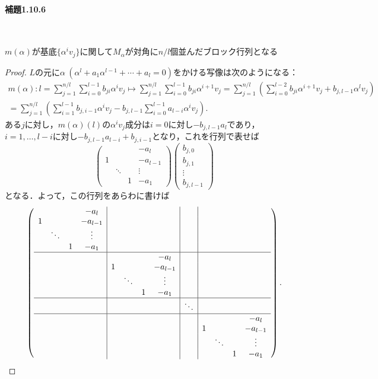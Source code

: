 \paragraph{補題1.10.6}~
\begin{screen}
    $m(\alpha)$が基底$\{\alpha^iv_j\}$に関して$M_\alpha$が対角に$n/l$個並んだブロック行列となる
\end{screen}
\begin{proof}
  $L$の元に$\alpha\ (\alpha^l+a_1\alpha^{l-1}+\cdots+a_l=0)$をかける写像は次のようになる：
  \begin{align*}
    m(\alpha) \colon l = \sum_{j=1}^{n/l}\sum_{i=0}^{l-1}b_{ji}\alpha^iv_j \mapsto \sum_{j=1}^{n/l}\sum_{i=0}^{l-1}b_{ji}\alpha^{i+1}v_j = \sum_{j=1}^{n/l}\left(\sum_{i=0}^{l-2}b_{ji}\alpha^{i+1}v_j+b_{j,l-1}\alpha^lv_j\right) \\
    = \sum_{j=1}^{n/l}\left(\sum_{i=1}^{l-1}b_{j, i-1}\alpha^iv_j-b_{j, l-1}\sum_{i=0}^{l-1}a_{l-i}\alpha^iv_j\right).
  \end{align*}
  ある$j$に対し，$m(\alpha)(l)$の$\alpha^iv_j$成分は$i=0$に対し$-b_{j,l-1}a_l$であり，$i=1,\ldots,l-i$に対し$-b_{j, l-1}a_{l-i}+b_{j, i-1}$となり，これを行列で表せば
  \[
  \left(
  \begin{array}{cccc}
    & & & -a_l\\
    1& & & -a_{l-1}\\
    & \ddots & & \vdots\\
    & & 1 & -a_1
  \end{array}
  \right)\left(
  \begin{array}{c}
    b_{j,0}\\
    b_{j,1}\\
    \vdots\\
    b_{j, l-1}
  \end{array}
  \right)
  \]
  となる．よって，この行列をあらわに書けば
  \[
  \left(
  \begin{array}{cccc|cccc|c|cccc}
    & & & -a_l & & & & & & & &\\
    1& & & -a_{l-1} & & & & & & & &\\
    & \ddots & & \vdots & & & & & & & &\\
    & & 1 & -a_1 & & & & & & & &\\
    \hline
    & & & & & & & -a_l & & & & &\\
    & & & & 1& & & -a_{l-1} & & & & &\\
    & & & & & \ddots & & \vdots & & & & &\\
    & & & & & & 1 & -a_1 & & & & &\\
    \hline
    & & & & & &  &  & \ddots & & & &\\
    \hline
    & & & & & & & & & & & & -a_l\\
    & & & & & & & & & 1 & & & -a_{l-1}\\
    & & & & & & & & & & \ddots & & \vdots\\
    & & & & & & & & & & & 1 & -a_1
  \end{array}
  \right).
  \]
\end{proof}


